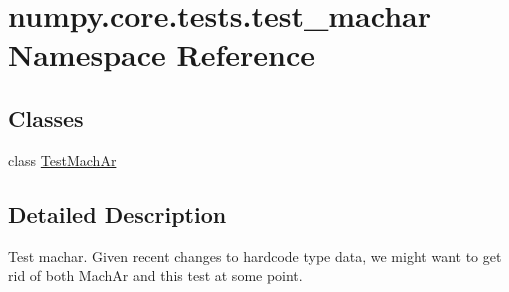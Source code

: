 \hypertarget{namespacenumpy_1_1core_1_1tests_1_1test__machar}{}\section{numpy.\+core.\+tests.\+test\+\_\+machar Namespace Reference}
\label{namespacenumpy_1_1core_1_1tests_1_1test__machar}
\subsection*{Classes}
\begin{DoxyCompactItemize}
\item 
class \hyperlink{classnumpy_1_1core_1_1tests_1_1test__machar_1_1TestMachAr}{Test\+Mach\+Ar}
\end{DoxyCompactItemize}


\subsection{Detailed Description}
\begin{DoxyVerb}Test machar. Given recent changes to hardcode type data, we might want to get
rid of both MachAr and this test at some point.\end{DoxyVerb}
 